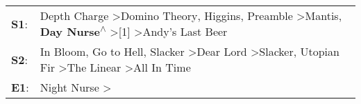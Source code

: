 \begin{supertabular}{p{0.03\textwidth}p{0.92\textwidth}}
 \textbf{S1}:  &  Depth Charge\textsuperscript{} \textgreater \enspace Domino Theory\textsuperscript{}, \enspace Higgins\textsuperscript{}, \enspace Preamble\textsuperscript{} \textgreater \enspace Mantis\textsuperscript{}, \enspace \textbf{Day Nurse\textsuperscript{$\wedge$}} \textgreater {}[1]\textsuperscript{} \textgreater \enspace Andy's Last Beer\textsuperscript{}  \enspace  \\
 \textbf{S2}:  &                        In Bloom\textsuperscript{}, \enspace Go to Hell\textsuperscript{}, \enspace Slacker\textsuperscript{} \textgreater \enspace Dear Lord\textsuperscript{} \textgreater \enspace Slacker\textsuperscript{}, \enspace Utopian Fir\textsuperscript{} \textgreater \enspace The Linear\textsuperscript{} \textgreater \enspace All In Time\textsuperscript{}  \enspace  \\
 \textbf{E1}:  &                                                                                                                                                                                                                                                                                                    Night Nurse\textsuperscript{} \textgreater {}\textsuperscript{}  \enspace  \\
\end{supertabular}
